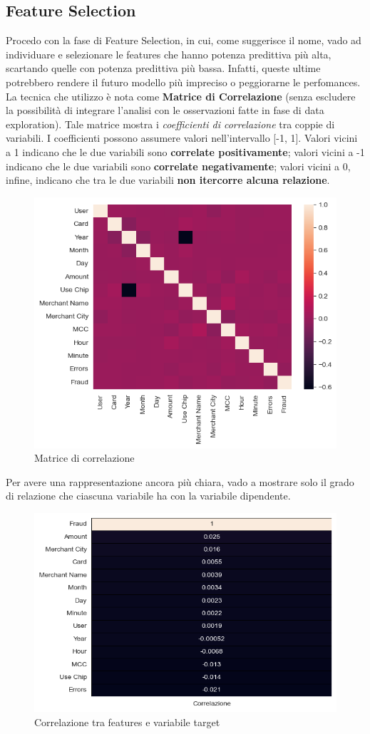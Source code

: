 \documentclass[]{article}
\begin{document}
    \subsection{Feature Selection}
        Procedo con la fase di Feature Selection, in cui, come suggerisce il nome, vado ad individuare e selezionare le features che hanno potenza predittiva più alta, scartando quelle con potenza predittiva più bassa. Infatti, queste ultime potrebbero rendere il futuro modello più impreciso o peggiorarne le perfomances.\\
        La tecnica che utilizzo è nota come \textbf{Matrice di Correlazione} (senza escludere la possibilità di integrare l'analisi con le osservazioni fatte in fase di data exploration). Tale matrice mostra i \textit{coefficienti di correlazione} tra coppie di variabili. I coefficienti possono assumere valori nell'intervallo [-1, 1]. Valori vicini a 1 indicano che le due variabili sono \textbf{correlate positivamente}; valori vicini a -1 indicano che le due variabili sono \textbf{correlate negativamente}; valori vicini a 0, infine, indicano che tra le due variabili \textbf{non itercorre alcuna relazione}.
        \begin{figure}[H]
            \centering
            \includegraphics[width=.6\textwidth]{img/CorrelationMatrix.png}
            \caption[short]{Matrice di correlazione}
        \end{figure}
        Per avere una rappresentazione ancora più chiara, vado a mostrare solo il grado di relazione che ciascuna variabile ha con la variabile dipendente.
        \begin{figure}[H]
            \centering
            \includegraphics[width=.5\textwidth]{img/Correlation.png}
            \caption[short]{Correlazione tra features e variabile target}
        \end{figure}
\end{document}
